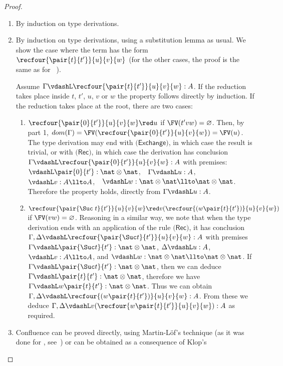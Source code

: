 \documentclass{article}
\begin{document}
\begin{proof}\ 
\begin{enumerate}
\item
By induction on  type derivations.
\item
By induction on type derivations,
using a substitution lemma as usual. 
We show the case where the term has the form $\recfour{\pair{t}{t'}}{u}{v}{w}$ (for the other
cases, the proof is the same as for \LLCI~\cite{AlvesS:TCS}). 

Assume 
$\Gamma \vdashL \recfour{\pair{t}{t'}}{u}{v}{w}: A$.
If the reduction takes
place inside $t$, $t'$, $u$, $v$ or $w$ the property follows directly by
induction.
If the reduction takes place at the root, there are two cases:
\begin{enumerate}
\item
$\recfour{\pair{0}{t'}}{u}{v}{w} \red u$ if
  $\FV(t'vw)=\varnothing$. Then, by part 1, $dom(\Gamma) =
  \FV(\recfour{\pair{0}{t'}}{u}{v}{w})= \FV(u)$. The type
  derivation may end with $\textsf{(Exchange)}$, in which case the result
  is trivial, or with $\textsf{(Rec)}$, in which case the derivation has
  conclusion $\Gamma \vdashL
  \recfour{\pair{0}{t'}}{u}{v}{w}:A$ with premises:
  $\vdashL \pair{0}{t'} : \nat \otimes \nat$,\ \ $\Gamma
  \vdashL u:A$,\ \ $\vdashL v:A\llto A$,\ \ 
  $\vdashL w: \nat \otimes \nat \llto \nat \otimes
  \nat$. Therefore the property holds, directly from  $\Gamma
  \vdashL u:A$.
\item
$\recfour{\pair{\Suc\; t}{t'}}{u}{v}{w} \red v
  (\recfour{(w\pair{t}{t'})}{u}{v}{w})$ if
  $\FV(vw)=\varnothing$. Reasoning in a similar way, we note that when
  the type derivation ends with an application of the rule
  $\textsf{(Rec)}$, it has conclusion $\Gamma,\Delta
  \vdashL \recfour{\pair{\Suc t}{t'}}{u}{v}{w}:A$ with
  premises $\Gamma \vdashL \pair{\Suc t}{t'} : \nat
  \otimes \nat$, $\Delta \vdashL u:A$, $\vdashL
  v:A\llto A$, and $\vdashL w: \nat \otimes \nat \llto \nat
  \otimes \nat$. 
If  $\Gamma \vdashL \pair{\Suc t}{t'} :
\nat \otimes \nat$, then we can deduce  $\Gamma \vdashL \pair{t}{t'} :
\nat \otimes \nat$, therefore we have $\Gamma \vdashL w\pair{t}{t'} :
\nat \otimes \nat$. Thus we can obtain $\Gamma,\Delta
\vdashL \recfour{(w\pair{t}{t'})}{u}{v}{w}: A$. From these we deduce
$\Gamma,\Delta \vdashL v (\recfour{w\pair{t}{t'}}{u}{v}{w}): A$ as
required.
\end{enumerate}
\item
Confluence can be proved directly, using
Martin-L\"of's technique (as it was done for \LLCI,
see~\cite{AlvesS:phd}) or can be obtained as a consequence of Klop's

\end{enumerate}
\end{proof}
\end{document}
